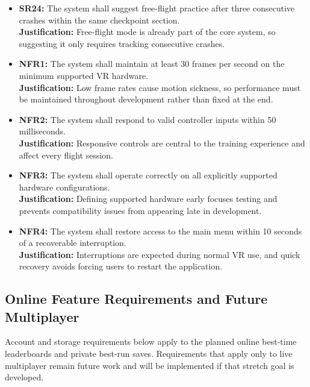 \documentclass{article}
\newcommand{\reqref}[1]{#1}
\begin{document}
\begin{itemize}
    \item \textbf{\reqref{SR24}:} The system shall suggest free-flight practice after three consecutive crashes within the same checkpoint section.\\
    \textbf{Justification:} Free-flight mode is already part of the core system, so suggesting it only requires tracking consecutive crashes.

    \item \textbf{\reqref{NFR1}:} The system shall maintain at least 30 frames per second on the minimum supported VR hardware.\\
    \textbf{Justification:} Low frame rates cause motion sickness, so performance must be maintained throughout development rather than fixed at the end.

    \item \textbf{\reqref{NFR2}:} The system shall respond to valid controller inputs within 50 milliseconds.\\
    \textbf{Justification:} Responsive controls are central to the training experience and affect every flight session.

    \item \textbf{\reqref{NFR3}:} The system shall operate correctly on all explicitly supported hardware configurations.\\
    \textbf{Justification:} Defining supported hardware early focuses testing and prevents compatibility issues from appearing late in development.

    \item \textbf{\reqref{NFR4}:} The system shall restore access to the main menu within 10 seconds of a recoverable interruption.\\
    \textbf{Justification:} Interruptions are expected during normal VR use, and quick recovery avoids forcing users to restart the application.
\end{itemize}

\subsection{Online Feature Requirements and Future Multiplayer}

Account and storage requirements below apply to the planned online best-time
leaderboards and private best-run saves. Requirements that apply only to live
multiplayer remain future work and will be implemented if that stretch goal is
developed.
\end{document}
